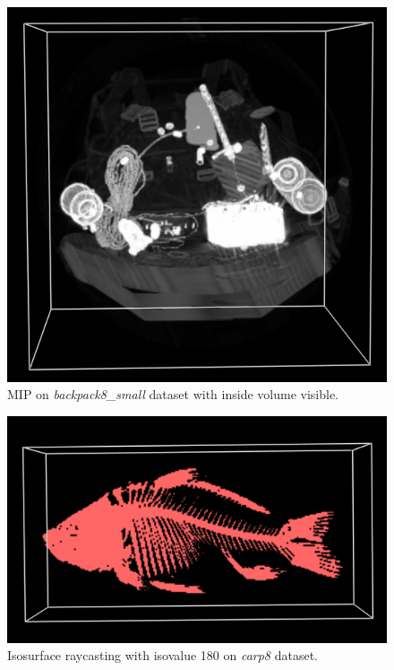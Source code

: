 \documentclass[a4paper]{article}
\begin{document}
\begin{figure}[h]
  \centering
  \includegraphics[width=\textwidth]{backpack-MIP}
  \caption{MIP on \textit{backpack8\_small} dataset with inside volume visible.}
  \label{fig:backpack-mip}
\end{figure}

\begin{figure}[h]
  \centering
  \includegraphics[width=\textwidth]{carp-iso-180}
  \caption{Isosurface raycasting with isovalue 180 on \textit{carp8} dataset.}
  \label{fig:carp-skelet}
\end{figure}
\end{document}
